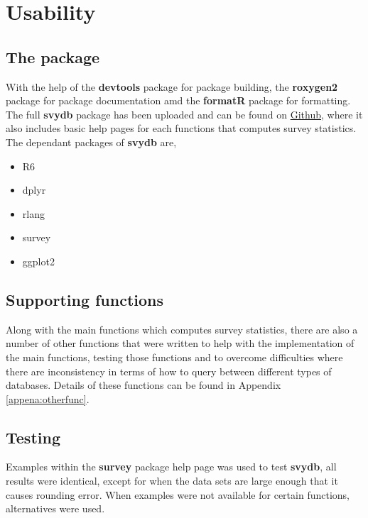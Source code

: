 
\chapter{Usability} \label{c5} %

\section{The package}
With the help of the {\bf devtools} package \citep{devtoolspackage} for package building, the {\bf roxygen2}  package \citep{roxygen2package} for package documentation amd the {\bf formatR} \citep{formatrpackage} package for formatting. The full {\bf svydb} package has been uploaded and can be found on \href{https://github.com/chrk623/svydb}{Github}, where it also includes basic help pages for each functions that computes survey statistics.\\

The dependant packages of {\bf svydb} are,
{\bf
    \begin{itemize}
        \item R6 \citep{R6package}
        \item dplyr \citep{dplyrpackage}
        \item rlang \citep{rlangpackage}
        \item survey \citep{surveypackage}
        \item ggplot2 \citep{ggplotpackage}
    \end{itemize}
}



\section{Supporting functions}
Along with the main functions which computes survey statistics, there are also a number of other functions that were written to help with the implementation of the main functions, testing those functions and to overcome difficulties where there are inconsistency in terms of how to query between different types of databases. Details of these functions can be found in Appendix \ref{appena:otherfunc}.

\section{Testing}


Examples within the {\bf survey} package help page was used to test {\bf svydb}, all results were identical, except for when the data sets are large enough that it causes rounding error. When examples were not available for certain functions, alternatives were used.
